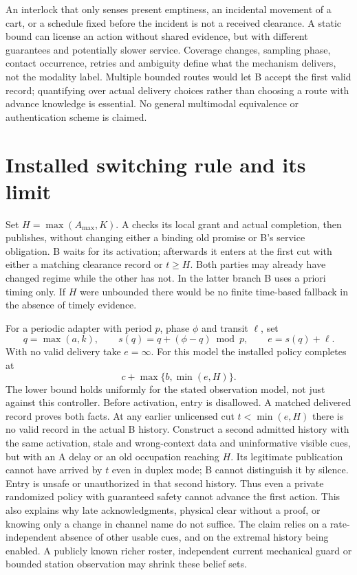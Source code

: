 \documentclass[11pt]{article}
\begin{document}
An interlock that only senses present emptiness, an incidental movement of a cart, or a schedule fixed before the incident is not a received clearance. A static bound can license an action without shared evidence, but with different guarantees and potentially slower service. Coverage changes, sampling phase, contact occurrence, retries and ambiguity define what the mechanism delivers, not the modality label. Multiple bounded routes would let B accept the first valid record; quantifying over actual delivery choices rather than choosing a route with advance knowledge is essential. No general multimodal equivalence or authentication scheme is claimed.

\section{Installed switching rule and its limit}
Set $H=\max(A_{\max},K)$. A checks its local grant and actual completion, then publishes, without changing either a binding old promise or B's service obligation. B waits for its activation; afterwards it enters at the first cut with either a matching clearance record or $t\ge H$. Both parties may already have changed regime while the other has not. In the latter branch B uses a priori timing only. If $H$ were unbounded there would be no finite time-based fallback in the absence of timely evidence.

For a periodic adapter with period $p$, phase $\phi$ and transit $\ell$, set
\[
q = \max(a,k),\qquad
s(q)=q+(\phi-q)\bmod p,\qquad e=s(q)+\ell.
\]
With no valid delivery take $e=\infty$. For this model the installed policy completes at
\[
                          c+\max\{b,\min(e,H)\}.
\]
The lower bound holds uniformly for the stated observation model, not just against this controller. Before activation, entry is disallowed. A matched delivered record proves both facts. At any earlier unlicensed cut $t < \min(e,H)$ there is no valid record in the actual B history. Construct a second admitted history with the same activation, stale and wrong-context data and uninformative visible cues, but with an A delay or an old occupation reaching $H$. Its legitimate publication cannot have arrived by $t$ even in duplex mode; B cannot distinguish it by silence. Entry is unsafe or unauthorized in that second history. Thus even a private randomized policy with guaranteed safety cannot advance the first action. This also explains why late acknowledgments, physical clear without a proof, or knowing only a change in channel name do not suffice. The claim relies on a rate-independent absence of other usable cues, and on the extremal history being enabled. A publicly known richer roster, independent current mechanical guard or bounded station observation may shrink these belief sets.
\end{document}
